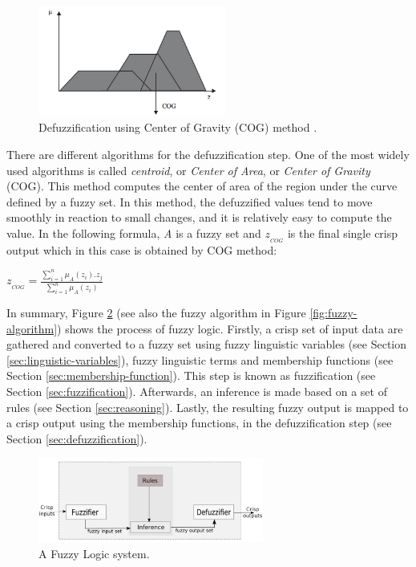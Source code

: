 \documentclass[11pt]{article}
\begin{document}
\begin{figure}[tbh]
  \center
  \includegraphics[width=0.55\textwidth]{figure/cog.png}
  \caption{Defuzzification using Center of Gravity (COG) method
  \cite{antonio:cog-defuzzification}.}
  \label{fig:defuzzification}
\end{figure}

There are different algorithms for the defuzzification step. One of the most
widely used algorithms is called \textit{centroid}, or \textit{Center of
Area}, or \textit{Center of Gravity} (COG). This method computes the center of
area of the region under the curve defined by a fuzzy set. In this method, the
defuzzified values tend to move smoothly in reaction to small changes, and it is
relatively easy to compute the value. In the following formula, \textit{A} is
a fuzzy set and $z_{_{COG}}$ is the final single crisp output which in this case
is obtained by COG method:\\

\begin{center}
$z_{_{COG}} = \frac{\sum\limits_{i=1}^{n} \mu_A(z_i).z_j}{\sum\limits_{i=1}^{n}
\mu_A(z_i)}$
\end{center}

In summary, Figure \ref{fig:fuzzy-system} (see also the fuzzy algorithm in
Figure \ref{fig:fuzzy-algorithm}) shows the process of fuzzy logic. Firstly, a
crisp set of input data are gathered and converted to a fuzzy set using fuzzy
linguistic variables (see Section \ref{sec:linguistic-variables}), fuzzy
linguistic terms and membership functions (see Section
\ref{sec:membership-function}). This step is known as fuzzification (see Section
\ref{sec:fuzzification}). Afterwards, an inference is made based on a set of
rules (see Section \ref{sec:reasoning}). Lastly, the resulting fuzzy output is
mapped to a crisp output using the membership functions, in the defuzzification
step (see Section \ref{sec:defuzzification}).

\begin{figure}[tbh]
  \center
  \includegraphics[width=0.66\textwidth]{figure/fuzzy-system.png}
  \caption{A Fuzzy Logic system.}
  \label{fig:fuzzy-system}
\end{figure}
\end{document}
